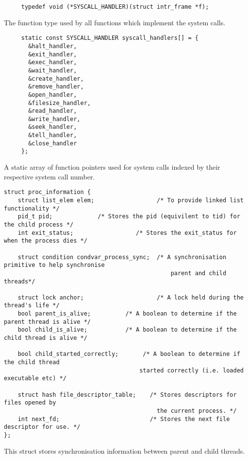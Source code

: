 \documentclass[a4wide, 11pt]{article}
\newcommand{\tab}{\hspace*{2em}}
\begin{document}
\begin{verbatim}
     typedef void (*SYSCALL_HANDLER)(struct intr_frame *f);
\end{verbatim}

\tab The function type used by all functions which implement the system calls.

\begin{verbatim}
     static const SYSCALL_HANDLER syscall_handlers[] = {
       &halt_handler,
       &exit_handler,
       &exec_handler,
       &wait_handler,
       &create_handler,
       &remove_handler,
       &open_handler,
       &filesize_handler,
       &read_handler,
       &write_handler,
       &seek_handler,
       &tell_handler,
       &close_handler
     };
\end{verbatim}

\tab A static array of function pointers used for system calls indexed by their respective system call number.

\begin{verbatim}
struct proc_information { 
    struct list_elem elem;                  /* To provide linked list functionality */
    pid_t pid;             /* Stores the pid (equivilent to tid) for the child process */
    int exit_status;                  /* Stores the exit_status for when the process dies */
    
    struct condition condvar_process_sync;  /* A synchronisation primitive to help synchronise 
                                                parent and child threads*/
                                                
    struct lock anchor;                     /* A lock held during the thread's life */
    bool parent_is_alive;          /* A boolean to determine if the parent thread is alive */
    bool child_is_alive;           /* A boolean to determine if the child thread is alive */
    
    bool child_started_correctly;       /* A boolean to determine if the child thread 
                                       started correctly (i.e. loaded executable etc) */
    
    struct hash file_descriptor_table;    /* Stores descriptors for files opened by 
                                            the current process. */ 
    int next_fd;                          /* Stores the next file descriptor for use. */
};
\end{verbatim}

\tab This struct stores synchronisation information between parent and child threads.
\end{document}
